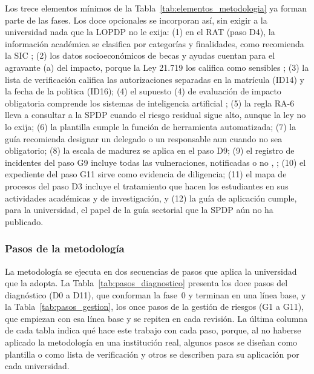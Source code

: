 Los trece elementos mínimos de la Tabla~\ref{tab:elementos_metodologia} ya forman parte de las fases. Los doce opcionales se incorporan así, sin exigir a la universidad nada que la LOPDP no le exija: (1) en el RAT (paso D4), la información académica se clasifica por categorías y finalidades, como recomienda la SIC \cite{sic2026universitario}; (2) los datos socioeconómicos de becas y ayudas cuentan para el agravante (a) del impacto, porque la Ley 21.719 los califica como sensibles \cite[art.~2, lit.~g]{chile2024ley21719}; (3) la lista de verificación califica las autorizaciones separadas en la matrícula (ID14) y la fecha de la política (ID16); (4) el supuesto (4) de evaluación de impacto obligatoria comprende los sistemas de inteligencia artificial \cite{sic2026universitario}; (5) la regla RA-6 lleva a consultar a la SPDP cuando el riesgo residual sigue alto, aunque la ley no lo exija; (6) la plantilla cumple la función de herramienta automatizada; (7) la guía recomienda designar un delegado o un responsable aun cuando no sea obligatorio; (8) la escala de madurez se aplica en el paso D9; (9) el registro de incidentes del paso G9 incluye todas las vulneraciones, notificadas o no \cite[art.~33.5]{rgpd2016}, \cite[art.~14 sexies]{chile2024ley21719}; (10) el expediente del paso G11 sirve como evidencia de diligencia; (11) el mapa de procesos del paso D3 incluye el tratamiento que hacen los estudiantes en sus actividades académicas y de investigación, y (12) la guía de aplicación cumple, para la universidad, el papel de la guía sectorial que la SPDP aún no ha publicado.

\subsubsection{Pasos de la metodología}
\label{sec:pasos_metodologia}

La metodología se ejecuta en dos secuencias de pasos que aplica la universidad que la adopta. La Tabla~\ref{tab:pasos_diagnostico} presenta los doce pasos del diagnóstico (D0 a D11), que conforman la fase~0 y terminan en una línea base, y la Tabla~\ref{tab:pasos_gestion}, los once pasos de la gestión de riesgos (G1 a G11), que empiezan con esa línea base y se repiten en cada revisión. La última columna de cada tabla indica qué hace este trabajo con cada paso, porque, al no haberse aplicado la metodología en una institución real, algunos pasos se diseñan como plantilla o como lista de verificación y otros se describen para su aplicación por cada universidad.

